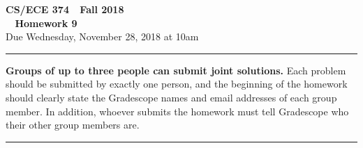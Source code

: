 \documentclass[11pt]{article}
\begin{document}

\thispagestyle{empty}

\begin{center}
\Large\textbf{CS/ECE 374 \,\decosix\,  Fall 2018}%
\\
\LARGE\textbf{\decothreeleft~ Homework 9 ~\decothreeright}%
\\[0.5ex]
\large Due Wednesday, November 28, 2018 at 10am
\end{center}

\bigskip
\hrule
\bigskip

\noindent
\textbf{Groups of up to three people can submit joint solutions.}
Each problem should be submitted by exactly one person, and the
beginning of the homework should clearly state the Gradescope names
and email addresses of each group member.  In addition, whoever
submits the homework must tell Gradescope who their other group
members are.
\bigskip \hrule \bigskip
\end{document}
